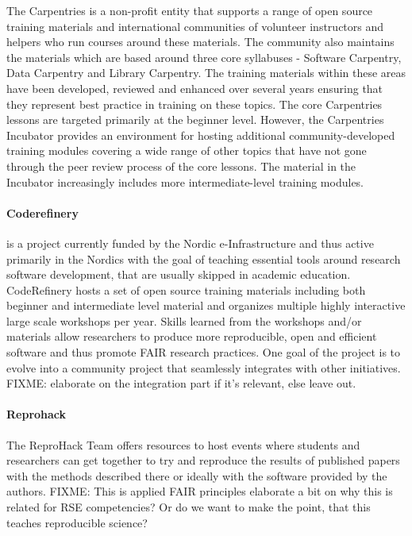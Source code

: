 \documentclass[a4paper
]{article}
\begin{document}
The Carpentries \autocite{Carpentries} is a non-profit entity that
supports a range of open source training materials and international
communities of volunteer instructors and helpers who run courses around
these materials. The community also maintains the materials which are
based around three core syllabuses - Software Carpentry, Data Carpentry
and Library Carpentry. The training materials within these areas have
been developed, reviewed and enhanced over several years ensuring that
they represent best practice in training on these topics. The core
Carpentries lessons are targeted primarily at the beginner level.
However, the Carpentries Incubator \autocite{CarpentriesIncubator}
provides an environment for hosting additional community-developed
training modules covering a wide range of other topics that have not
gone through the peer review process of the core lessons. The material
in the Incubator increasingly includes more intermediate-level training
modules.

\hypertarget{coderefinery}{%
\paragraph{Coderefinery}\label{coderefinery}}

\autocite{CodeRefinery} is a project currently funded by the Nordic
e-Infrastructure and thus active primarily in the Nordics with the goal
of teaching essential tools around research software development, that
are usually skipped in academic education. CodeRefinery hosts a set of
open source training materials including both beginner and intermediate
level material and organizes multiple highly interactive large scale
workshops per year. Skills learned from the workshops and/or materials
allow researchers to produce more reproducible, open and efficient
software and thus promote FAIR research practices. One goal of the
project is to evolve into a community project that seamlessly integrates
with other initiatives. FIXME: elaborate on the integration part if it's
relevant, else leave out.

\hypertarget{reprohack}{%
\paragraph{Reprohack}\label{reprohack}}

The ReproHack Team offers resources to host events where students and
researchers can get together to try and reproduce the results of
published papers with the methods described there or ideally with the
software provided by the authors. FIXME: This is applied FAIR principles
elaborate a bit on why this is related for RSE competencies? Or do we
want to make the point, that this teaches reproducible science?
\end{document}

